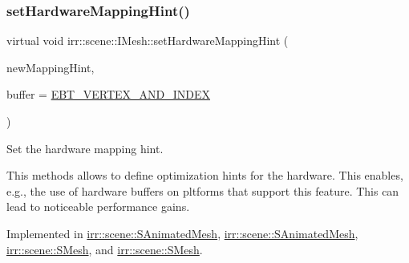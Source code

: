 \subsubsection{\texorpdfstring{set\+Hardware\+Mapping\+Hint()}{setHardwareMappingHint()}\hspace{0.1cm}{\footnotesize\ttfamily [1/2]}}
{\footnotesize\ttfamily virtual void irr\+::scene\+::\+I\+Mesh\+::set\+Hardware\+Mapping\+Hint (\begin{DoxyParamCaption}\item[{\hyperlink{namespaceirr_1_1scene_ac7d8ee8d77da75f2580bb9bb17231c27}{E\+\_\+\+H\+A\+R\+D\+W\+A\+R\+E\+\_\+\+M\+A\+P\+P\+I\+NG}}]{new\+Mapping\+Hint,  }\item[{\hyperlink{namespaceirr_1_1scene_a8f59a89ffef0ad8e5b2c2cb874a93e8c}{E\+\_\+\+B\+U\+F\+F\+E\+R\+\_\+\+T\+Y\+PE}}]{buffer = {\ttfamily \hyperlink{namespaceirr_1_1scene_a8f59a89ffef0ad8e5b2c2cb874a93e8ca34ea664123fbc28610408e51b014dcdd}{E\+B\+T\+\_\+\+V\+E\+R\+T\+E\+X\+\_\+\+A\+N\+D\+\_\+\+I\+N\+D\+EX}} }\end{DoxyParamCaption})\hspace{0.3cm}{\ttfamily [pure virtual]}}



Set the hardware mapping hint. 

This methods allows to define optimization hints for the hardware. This enables, e.\+g., the use of hardware buffers on pltforms that support this feature. This can lead to noticeable performance gains. 

Implemented in \hyperlink{structirr_1_1scene_1_1SAnimatedMesh_a69448fa91bd1c6316d11d9ae3b8b88e6}{irr\+::scene\+::\+S\+Animated\+Mesh}, \hyperlink{structirr_1_1scene_1_1SAnimatedMesh_a69448fa91bd1c6316d11d9ae3b8b88e6}{irr\+::scene\+::\+S\+Animated\+Mesh}, \hyperlink{structirr_1_1scene_1_1SMesh_a79839b08062bfcd283e441056bf846e6}{irr\+::scene\+::\+S\+Mesh}, and \hyperlink{structirr_1_1scene_1_1SMesh_a79839b08062bfcd283e441056bf846e6}{irr\+::scene\+::\+S\+Mesh}.

\mbox{\label{classirr_1_1scene_1_1IMesh_a1de908b8e67c28bdac546e8599043dfe}} 
